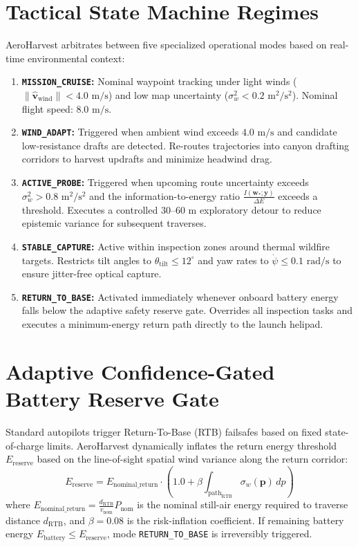 \documentclass[12pt,a4paper,oneside]{report}
\begin{document}
\section{Tactical State Machine Regimes}
AeroHarvest arbitrates between five specialized operational modes based on real-time environmental context:
\begin{enumerate}
    \item \textbf{\texttt{MISSION\_CRUISE}:} Nominal waypoint tracking under light winds ($\|\hat{\mathbf{v}}_{\text{wind}}\| < 4.0\text{ m/s}$) and low map uncertainty ($\sigma_w^2 < 0.2\text{ m}^2/\text{s}^2$). Nominal flight speed: $8.0\text{ m/s}$.
    \item \textbf{\texttt{WIND\_ADAPT}:} Triggered when ambient wind exceeds $4.0\text{ m/s}$ and candidate low-resistance drafts are detected. Re-routes trajectories into canyon drafting corridors to harvest updrafts and minimize headwind drag.
    \item \textbf{\texttt{ACTIVE\_PROBE}:} Triggered when upcoming route uncertainty exceeds $\sigma_w^2 > 0.8\text{ m}^2/\text{s}^2$ and the information-to-energy ratio $\frac{I(\mathbf{w}_*; \mathbf{y})}{\Delta E}$ exceeds a threshold. Executes a controlled 30--60 m exploratory detour to reduce epistemic variance for subsequent traverses.
    \item \textbf{\texttt{STABLE\_CAPTURE}:} Active within inspection zones around thermal wildfire targets. Restricts tilt angles to $\theta_{\text{tilt}} \le 12^\circ$ and yaw rates to $\dot{\psi} \le 0.1\text{ rad/s}$ to ensure jitter-free optical capture.
    \item \textbf{\texttt{RETURN\_TO\_BASE}:} Activated immediately whenever onboard battery energy falls below the adaptive safety reserve gate. Overrides all inspection tasks and executes a minimum-energy return path directly to the launch helipad.
\end{enumerate}

\section{Adaptive Confidence-Gated Battery Reserve Gate}
Standard autopilots trigger Return-To-Base (RTB) failsafes based on fixed state-of-charge limits. AeroHarvest dynamically inflates the return energy threshold $E_{\text{reserve}}$ based on the line-of-sight spatial wind variance along the return corridor:
\begin{equation}
    E_{\text{reserve}} = E_{\text{nominal\_return}} \cdot \left( 1.0 + \beta \int_{\text{path}_{\text{RTB}}} \sigma_w(\mathbf{p}) \, dp \right)
    \label{eq:adaptive_gate}
\end{equation}
where $E_{\text{nominal\_return}} = \frac{d_{\text{RTB}}}{v_{\text{nom}}} P_{\text{nom}}$ is the nominal still-air energy required to traverse distance $d_{\text{RTB}}$, and $\beta = 0.08$ is the risk-inflation coefficient. If remaining battery energy $E_{\text{battery}} \le E_{\text{reserve}}$, mode \texttt{RETURN\_TO\_BASE} is irreversibly triggered.
\end{document}
